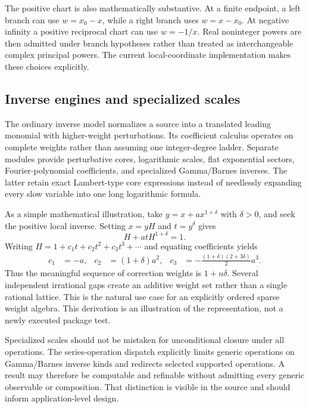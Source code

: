 \documentclass[11pt,letterpaper]{article}
\begin{document}
The positive chart is also mathematically substantive. At a finite endpoint, a left branch can use $w=x_0-x$, while a right branch uses $w=x-x_0$. At negative infinity a positive reciprocal chart can use $w=-1/x$. Real noninteger powers are then admitted under branch hypotheses rather than treated as interchangeable complex principal powers. The current local-coordinate implementation makes these choices explicitly.~\cite{core}

\subsection{Inverse engines and specialized scales}

The ordinary inverse model normalizes a source into a translated leading monomial with higher-weight perturbations. Its coefficient calculus operates on complete weights rather than assuming one integer-degree ladder. Separate modules provide perturbative cores, logarithmic scales, flat exponential sectors, Fourier-polynomial coefficients, and specialized Gamma/Barnes inverses. The latter retain exact Lambert-type core expressions instead of needlessly expanding every slow variable into one long logarithmic formula.~\cite{kernelmap}

As a simple mathematical illustration, take $y=x+a x^{1+\delta}$ with $\delta>0$, and seek the positive local inverse. Setting $x=yH$ and $t=y^\delta$ gives
\[
 H+a t H^{1+\delta}=1.
\]
Writing $H=1+c_1t+c_2t^2+c_3t^3+\cdots$ and equating coefficients yields
\begin{align*}
 c_1&=-a, & c_2&=(1+\delta)a^2,
 &c_3&=-\frac{(1+\delta)(2+3\delta)}2a^3.
\end{align*}
Thus the meaningful sequence of correction weights is $1+n\delta$. Several independent irrational gaps create an additive weight set rather than a single rational lattice. This is the natural use case for an explicitly ordered sparse weight algebra. This derivation is an illustration of the representation, not a newly executed package test.

Specialized scales should not be mistaken for unconditional closure under all operations. The series-operation dispatch explicitly limits generic operations on Gamma/Barnes inverse kinds and redirects selected supported operations. A result may therefore be computable and refinable without admitting every generic observable or composition. That distinction is visible in the source and should inform application-level design.~\cite{operations}
\end{document}
